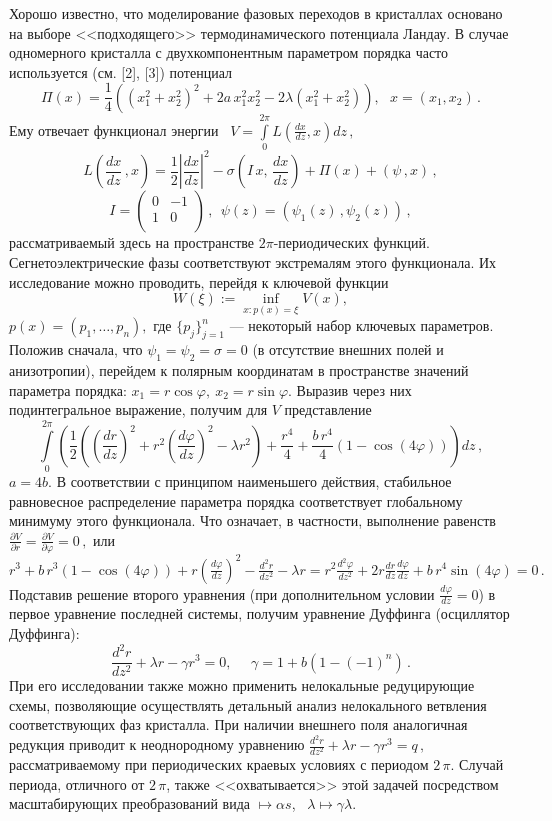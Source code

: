 Хорошо известно, что моделирование фазовых переходов в кристаллах
основано на выборе <<подходящего>> термодинамического потенциала
Ландау. В случае одномерного кристалла с двухкомпонентным параметром
порядка часто используется (см. [2], [3]) потенциал
 $$
\Pi(x) = \frac14 \left((x_1^2+x_2^2)^2+ 2a\,x_1^2x_2^2 -
2\lambda(x_1^2+x_2^2)\right), \ \ \  x =(x_1,x_2)\,.
 $$
Ему отвечает функционал энергии  \ $V =
\int\limits_0^{2\pi}L(\frac{d x}{d z},x)dz\,,$
 $$
L\left(\frac{d x}{d z}\,,x\right) = \frac12 \left|\frac{d x}{d
z}\right|^2- \sigma\left(I\,x,\,\frac{d x}{d z}\right) + \Pi(x) +
(\psi\,, x)\,,
 $$
 $$
I= \left(
    \begin{array}{cc}
    0 &- 1\\
   1 &  0\\
    \end{array}
    \right)\,,
\ \ \psi(z) =(\psi_1(z)\,, \psi_2(z))\,,
 $$
рассматриваемый здесь на пространстве $2\pi$-периодических функций.
Сегнетоэлектрические фазы соответствуют экстремалям этого
функционала. Их исследование можно проводить, перейдя к ключевой
функции
 $$
W(\xi):=\inf_{x:p(x)=\xi} V(x),
 $$
$p(x)=(p_1,\dots,p_n),$ где $\{p_j\}_{j=1}^n$ --- некоторый набор
ключевых параметров. Положив сначала, что $\psi_1 = \psi_2 =\sigma =
0$ (в отсутствие внешних полей и анизотропии), перейдем к полярным
координатам в пространстве значений параметра порядка:
 $
x_1=r\cos\varphi,\ x_2=r\sin\varphi.
 $
Выразив через них подинтегральное выражение, получим для $V$
представление
 {\footnotesize
 $$
\int\limits_0^{2\pi} \left(\frac12\left(\left(\frac{d r}{d
z}\right)^2 + r^2\left(\frac{d \varphi}{d z}\right)^2-\lambda r^2
\right) + \frac{r^4}4 +\frac{b\,r^4}4(1-\cos( 4\varphi))\right)dz\,,
 $$}
$a=4b$. В соответствии с принципом наименьшего действия, стабильное
равновесное распределение параметра порядка соответствует
глобальному минимуму этого функ\-ци\-о\-на\-ла. Что означает, в
частности, выполнение равенств
 $
\frac{\partial V}{\partial r}= \frac{\partial V}{\partial \varphi}=0
\,,
 $
или
 $
r^3 + b\,r^3(1-\cos (4\varphi)) + r\left(\frac{d \varphi}{d
z}\right)^2-\frac{d^2 r}{d z^2} -\lambda r = r^2\frac{d^2\varphi}{d
z^2} + 2r\frac{d r}{d z}\frac{d \varphi}{d z} + b\,r^4\sin(
4\varphi) = 0\,.
 $
Подставив решение второго уравнения (при дополнительном условии $
\frac{d \varphi}{d z}=0$) в первое уравнение последней системы,
получим уравнение Дуффинга (осциллятор Дуффинга):
 $$
 \frac{d^2 r}{d z^2} + \lambda r - \gamma  r^3=0, \
 \ \ \ \ \  \gamma = 1+b\left(1-(-1)^n\right)\,.
 $$
При его исследовании также можно применить нелокальные редуцирующие
схемы, позволяющие осуществлять детальный анализ нелокального
ветвления соответствующих фаз кристалла. При наличии внешнего поля
аналогичная редукция приводит к неоднородному уравнению
 $
\frac{d^2 r}{d z^2} + \lambda r - \gamma r^3=q\,,
 $
рассматриваемому при периодических краевых условиях с периодом
$2\,\pi$. Случай периода, отличного от $2\,\pi$, также
<<охватывается>> этой задачей посредством масштабирующих
преобразований вида $\longmapsto \alpha s$, \ $\lambda\longmapsto
\gamma \lambda$.

